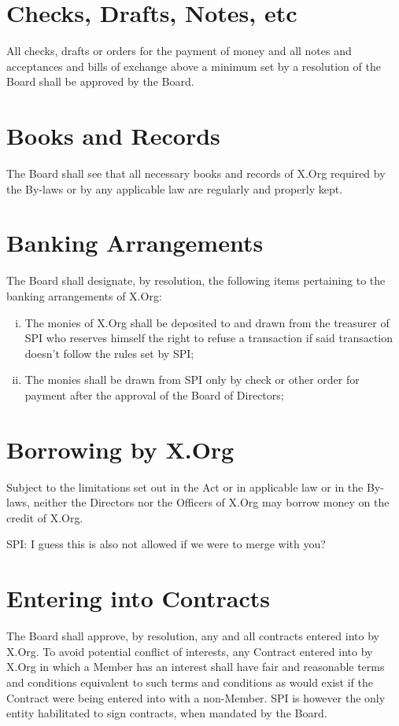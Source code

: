 \documentclass[10pt, english]{bylaws}
\begin{document}
\section{Checks, Drafts, Notes, etc}
All checks, drafts or orders for the payment of money and all notes and
acceptances
and bills of exchange above a minimum set by a resolution of the Board shall be
approved by the Board.

\section{Books and Records}
The Board shall see that all necessary books and records of X.Org required by
the By-laws or by any applicable law are regularly and properly kept.

\section{Banking Arrangements}
The Board shall designate, by resolution, the following items pertaining to the
banking arrangements of X.Org:

\begin{enumerate}[(i)\hspace{.2cm}]
	\item The monies of X.Org shall be deposited to and drawn from the
	treasurer of SPI who reserves himself the right to refuse a transaction
	if said transaction doesn't follow the rules set by SPI;

	\item The monies shall be drawn from SPI only by check or other order
	for payment after the approval of the Board of Directors;
\end{enumerate}

\section{Borrowing by X.Org}
Subject to the limitations set out in the Act or in applicable law or in the
By-laws, neither the Directors nor the Officers of X.Org may borrow money on the
credit of X.Org.

SPI: I guess this is also not allowed if we were to merge with you?

\section{Entering into Contracts}
\label{section_entering_contracts}
The Board shall approve, by resolution, any and all contracts entered into by
X.Org. To avoid potential conflict of interests, any Contract entered into by
X.Org in which a Member has an interest shall have fair and reasonable terms and
conditions equivalent to such terms and conditions as would exist if the
Contract were being entered into with a non-Member. SPI is however the only
entity habilitated to sign contracts, when mandated by the Board.
\end{document}
